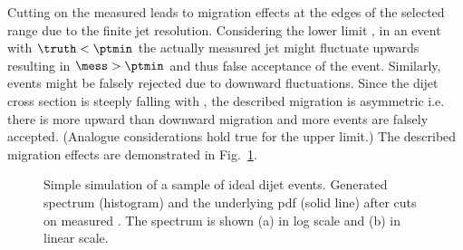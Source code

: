 \documentclass[a4paper]{cmspaper} %
\begin{document}
Cutting on the measured \pt leads to migration effects at the edges of the selected \pt range due to the finite jet resolution.
Considering the lower limit \ptmin, in an event with \mbox{$\truth < \ptmin$} the actually measured jet \pt might fluctuate upwards resulting in \mbox{$\mess > \ptmin$} and thus false acceptance of the event.
Similarly, events might be falsely rejected due to downward fluctuations.
Since the dijet cross section is steeply falling with \pt, the described migration is asymmetric i.e. there is more upward than downward migration and more events are falsely accepted.
(Analogue considerations hold true for the upper limit.)
The described migration effects are demonstrated in Fig.~\ref{fig:resFit:toyMC:ptCuts:spectrum}.

\begin{figure}[ht]
  \begin{center}
     
  \end{center}
  \caption{Simple simulation of a sample of ideal dijet
    events. Generated \truth spectrum (histogram) and the underlying pdf (solid
    line) after cuts on measured \pt. The spectrum is shown (a) in log
    scale and (b) in linear scale.}
  \label{fig:resFit:toyMC:ptCuts:spectrum}
\end{figure}
\end{document}
